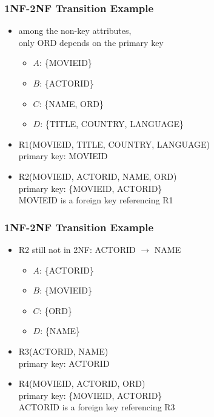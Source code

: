 \documentclass[dvipsnames]{beamer}
\begin{document}
\begin{frame}
  \frametitle{1NF-2NF Transition Example}

  \begin{itemize}
    \item among the non-key attributes,\\
      only ORD depends on the primary key
    \begin{itemize}
      \item $A$: \{MOVIEID\}
      \item $B$: \{ACTORID\}
      \item $C$: \{NAME, ORD\}
      \item $D$: \{TITLE, COUNTRY, LANGUAGE\}
    \end{itemize}

    \pause
    \medskip
    \item R1(MOVIEID, TITLE, COUNTRY, LANGUAGE)\\
      primary key: MOVIEID

    \item R2(MOVIEID, ACTORID, NAME, ORD)\\
      primary key: \{MOVIEID, ACTORID\}\\
      MOVIEID is a foreign key referencing R1
  \end{itemize}
\end{frame}

\begin{frame}
  \frametitle{1NF-2NF Transition Example}

  \begin{itemize}
    \item R2 still not in 2NF: ACTORID $\rightarrow$ NAME
    \begin{itemize}
      \item $A$: \{ACTORID\}
      \item $B$: \{MOVIEID\}
      \item $C$: \{ORD\}
      \item $D$: \{NAME\}
    \end{itemize}

    \pause
    \medskip
    \item R3(ACTORID, NAME)\\
      primary key: ACTORID

    \item R4(MOVIEID, ACTORID, ORD)\\
      primary key: \{MOVIEID, ACTORID\}\\
      ACTORID is a foreign key referencing R3
  \end{itemize}
\end{frame}
\end{document}
